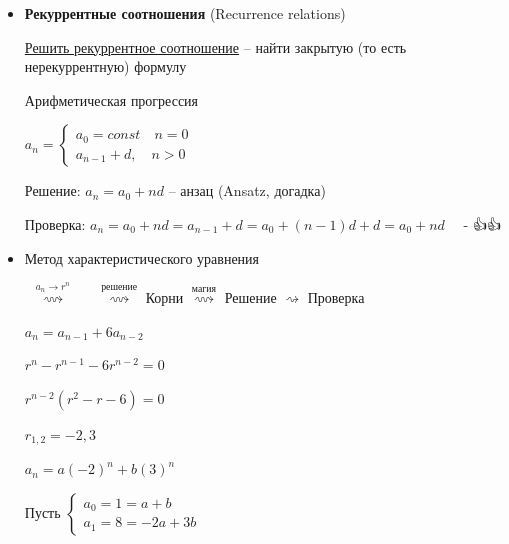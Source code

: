 \documentclass[12pt]{article}
\begin{document}
    \begin{itemize}
        \hypertarget{recurrencerelations}{}

        \item \textbf{Рекуррентные соотношения} (Recurrence relations)

        \underline{Решить рекуррентное соотношение} -- найти закрытую (то есть нерекуррентную) формулу

        \Ex Арифметическая прогрессия

        $a_n = \begin{cases}a_0 = const \quad n = 0 \\ a_{n - 1} + d, \quad n > 0\end{cases}$

        Решение: $a_n = a_0 + nd$ -- анзац (Ansatz, догадка)

        Проверка: $a_n = a_0 + nd = a_{n - 1} + d = a_0 + (n - 1)d + d = a_0 + nd \quad$ - {\Large👍👍}

        \item Метод характеристического уравнения

         \ $\stackrel{a_n \to r^n}{\rightsquigarrow}$ \  \ $\stackrel{\text{решение}}{\rightsquigarrow}$ Корни $\stackrel{\text{магия}}{\rightsquigarrow}$ Решение $\rightsquigarrow$ Проверка

        \Ex $a_n = a_{n - 1} + 6a_{n - 2}$

        $r^n - r^{n - 1} - 6r^{n - 2} = 0$

        $r^{n-  2} (r^2 - r - 6) = 0$

        $r_{1,2} = -2, 3$


        \vspace{3mm}

        $a_n = a(-2)^n + b(3)^n$

        Пусть $\begin{cases}a_0 = 1 = a + b \\ a_1 = 8 = -2a + 3b\end{cases}$


\end{itemize}
\end{document}

